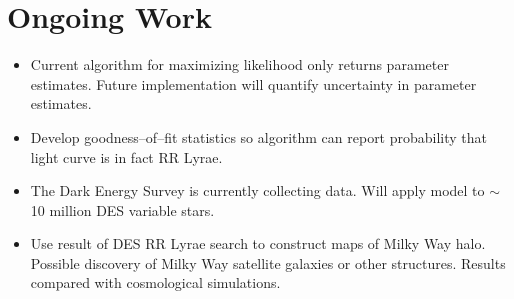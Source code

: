 \documentclass[a0,portrait]{a0poster}
\begin{document}
\begin{multicols}{2}
\begin{itemize}
\end{itemize}

\section*{Ongoing Work}

\begin{itemize}
\item Current algorithm for maximizing likelihood only returns parameter estimates. Future implementation will quantify uncertainty in parameter estimates.
\item Develop goodness--of--fit statistics so algorithm can report probability that light curve is in fact RR Lyrae.
\item The Dark Energy Survey is currently collecting data. Will apply model to $\sim$ 10 million DES variable stars.
\item Use result of DES RR Lyrae search to construct maps of Milky Way halo. Possible discovery of Milky Way satellite galaxies or other structures. Results compared with cosmological simulations.
\end{itemize}










\end{multicols}
\end{document}
